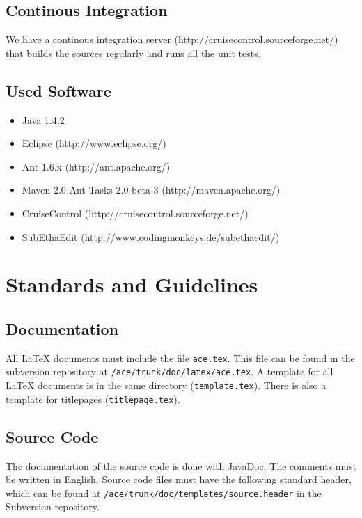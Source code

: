\documentclass[11pt,a4paper]{article}
\begin{document}
\subsection{Continous Integration}
We have a continous integration server (http://cruisecontrol.sourceforge.net/) 
that builds the sources regularly and runs all the unit tests.

\subsection{Used Software}
\begin{itemize}
 \item Java 1.4.2
 \item Eclipse (http://www.eclipse.org/)
 \item Ant 1.6.x (http://ant.apache.org/)
 \item Maven 2.0 Ant Tasks 2.0-beta-3 (http://maven.apache.org/)
 \item CruiseControl (http://cruisecontrol.sourceforge.net/)
 \item SubEthaEdit (http://www.codingmonkeys.de/subethaedit/)
\end{itemize}


\section{Standards and Guidelines}

\subsection{Documentation}
All \LaTeX{} documents must include the file \texttt{ace.tex}. This file can be 
found in the subversion repository at \texttt{/ace/trunk/doc/latex/ace.tex}. A 
template for all \LaTeX{} documents is in the same directory 
(\texttt{template.tex}). There is also a template for titlepages 
(\texttt{titlepage.tex}).

\subsection{Source Code}
The documentation of the source code is done with JavaDoc. The comments must 
be written in English. Source code files must have the following standard 
header, which can be found at \texttt{/ace/trunk/doc/templates/source.header} 
in the Subversion repository.
\end{document}
